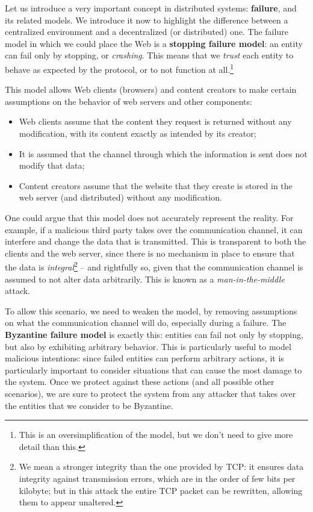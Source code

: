 \documentclass[mscthesis]{usiinfthesis}
\begin{document}
Let us introduce a very important concept in distributed systems: \textbf{failure}, and its related models.
We introduce it now to highlight the difference between a centralized environment and a decentralized (or distributed) one.
The failure model in which we could place the Web is a \textbf{stopping failure model}: an entity can fail only by stopping, or \textit{crashing}. This means that we \textit{trust} each entity to behave as expected by the protocol, or to not function at all.\footnote{This is an oversimplification of the model, but we don't need to give more detail than this.} %

This model allows Web clients (browsers) %
and content creators to make certain assumptions on the behavior of web servers and other components:
\begin{itemize}
	\item Web clients assume that the content they request is returned without any modification, with its content exactly as intended by its creator;
	\item It is assumed that the channel through which the information is sent does not modify that data;
	\item Content creators assume that the website that they create is stored in the web server (and distributed) without any modification.
\end{itemize}

One could argue that this model does not accurately represent the reality. For example, if a malicious third party takes over the communication channel, it can interfere %
and change the data that is transmitted. This is transparent to both the clients and the web server, since there is no mechanism in place to ensure that the data is \textit{integral}\footnote{We mean a stronger integrity than the one provided by TCP: it ensures data integrity against transmission errors, which are in the order of few bits per kilobyte; but in this attack the entire TCP packet can be rewritten, allowing them to appear unaltered.} -- and rightfully so, given that the communication channel is assumed to not alter data arbitrarily. This is known as a \textit{man-in-the-middle} attack.

To allow this scenario, we need to weaken the model, by removing assumptions on what the communication channel will do, especially during a failure.
The \textbf{Byzantine failure model} is exactly this: entities can fail not only by stopping, but also by exhibiting arbitrary behavior.
This is particularly useful to model malicious intentions: since failed entities can perform arbitrary actions, it is particularly important to consider situations that can cause the most damage to the system. Once we protect against these actions (and all possible other scenarios), we are sure to protect the system from any attacker that takes over the entities that we consider to be Byzantine.
\end{document}
